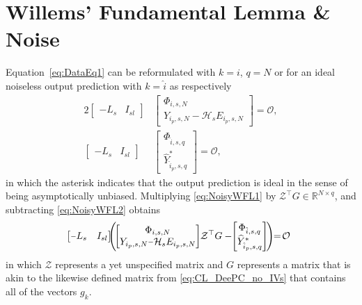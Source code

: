 \section{Willems' Fundamental Lemma \& Noise}
Equation~\eqref{eq:DataEq1} can be reformulated with $k=i$, $q=N$ or for an ideal noiseless output prediction with $k=\hat{i}$ as respectively
\begin{alignat}{2}
    \begin{bmatrix}
        -L_s & I_{sl}
    \end{bmatrix}&
    \begin{bmatrix}
        \Phi_{i,s,N}\\
        Y_{i_p,s,N}-\mathcal{H}_s E_{i_p,s,N}
    \end{bmatrix} = \mathcal{O},\label{eq:NoisyWFL1}\\%
    \begin{bmatrix}
        -L_s & I_{sl}
    \end{bmatrix}&
    \begin{bmatrix}
        \Phi_{\hat{i},s,q}\\
        \widehat{Y}^*_{\hat{i}_p,s,q}
    \end{bmatrix} = \mathcal{O}, \label{eq:NoisyWFL2}
\end{alignat}
in which the asterisk indicates that the output prediction is ideal in the sense of being asymptotically unbiased. Multiplying \eqref{eq:NoisyWFL1} by $\mathcal{Z}^\top G\in\mathbb{R}^{N\times q}$, and subtracting \eqref{eq:NoisyWFL2} obtains
\begin{align}\label{eq:NoisyWFL3}
    \mkern-14mu\begin{bmatrix}
        \shortminus L_s & I_{sl}
    \end{bmatrix}
    \mkern-9mu\left(\mkern-3mu%
    \begin{bmatrix}
        \Phi_{i,s,N}\\
        Y_{i_p,s,N}\shortminus\mathcal{H}_s E_{i_p,s,N}
    \end{bmatrix}%
    \mkern-4mu\mathcal{Z}^\top G%
    -%
    \mkern-5mu\begin{bmatrix}
        \Phi_{\hat{i},s,q}\\
        \widehat{Y}^*_{\hat{i}_p,s,q}
    \end{bmatrix}\mkern-3mu\right)\mkern-6mu=\mkern-3mu\mathcal{O}\mkern-5mu%
\end{align}
in which $\mathcal{Z}$ represents a yet unspecified matrix and $G$ represents a matrix that is akin to the likewise defined matrix from \eqref{eq:CL_DeePC_no_IVs} that contains all of the vectors $g_k$.

